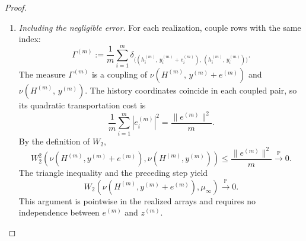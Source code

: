 \begin{proof}
\begin{enumerate}[wide]
            \item \emph{Including the negligible error.}
            For each realization, couple rows with the same index:
            \[
                \Gamma^{(m)}
                :=
                \frac1m\sum_{i=1}^m
                \delta_{\bigl(
                    (h_i^{(m)}, \, y_i^{(m)}+e_i^{(m)}), \,
                    (h_i^{(m)}, \, y_i^{(m)})
                \bigr)}.
            \]
            The measure $\Gamma^{(m)}$ is a coupling of
            $\nu(H^{(m)}, \,y^{(m)}+e^{(m)})$ and
            $\nu(H^{(m)}, \,y^{(m)})$.
            The history coordinates coincide in each coupled pair,
            so its quadratic transportation cost is
            \[
                \frac1m\sum_{i=1}^m |e_i^{(m)}|^2
                =
                \frac{\|e^{(m)}\|^2}{m}.
            \]
            By the definition of $W_2$,
            \[
                W_2^2\left(
                    \nu(H^{(m)},y^{(m)}+e^{(m)}),
                    \nu(H^{(m)},y^{(m)})
                \right)
                \leq\frac{\|e^{(m)}\|^2}{m}
                \xrightarrow{\mathbb P}0.
            \]
            The triangle inequality and the preceding step yield
            \[
                W_2\left(
                    \nu(H^{(m)},y^{(m)}+e^{(m)}),
                    \mu_\infty
                \right)
                \xrightarrow{\mathbb P}0.
            \]
            This argument is pointwise in the realized arrays and
            requires no independence between $e^{(m)}$ and
            $z^{(m)}$.
        

\end{enumerate}
\end{proof}
